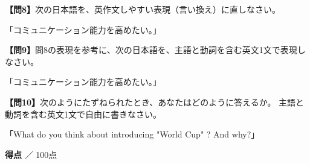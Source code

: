 \noindent\textbf{【問8】}次の日本語を、英作文しやすい表現（言い換え）に直しなさい。

「コミュニケーション能力を高めたい。」

\vfill

\noindent\textbf{【問9】}問8の表現を参考に、次の日本語を、主語と動詞を含む英文1文で表現しなさい。

「コミュニケーション能力を高めたい。」

\vfill

\noindent\textbf{【問10】}次のようにたずねられたとき、あなたはどのように答えるか。
主語と動詞を含む英文1文で自由に書きなさい。

「What do you think about introducing "World Cup" ? And why?」


\vfill
\begin{flushright}
\textbf{得点} \underline{\hspace{8em}} ／ 100点
\end{flushright}
